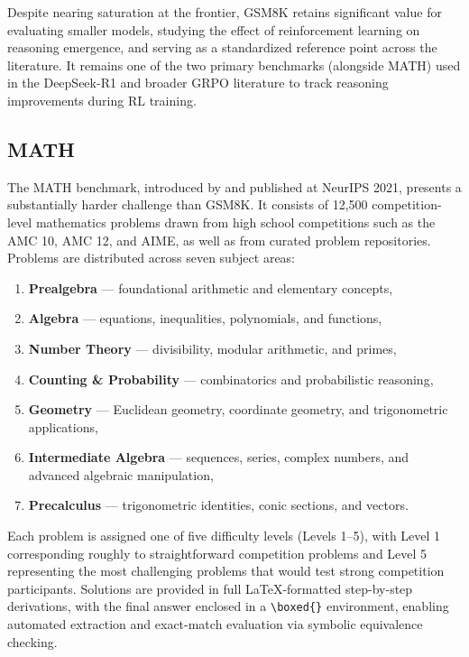 Despite nearing saturation at the frontier, GSM8K retains significant value for evaluating smaller models, studying the effect of reinforcement learning on reasoning emergence, and serving as a standardized reference point across the literature. It remains one of the two primary benchmarks (alongside MATH) used in the DeepSeek-R1 \cite{deepseek2025r1} and broader GRPO literature to track reasoning improvements during RL training.

\subsection{MATH}

The MATH benchmark, introduced by \cite{hendrycks2021math} and published at NeurIPS 2021, presents a substantially harder challenge than GSM8K. It consists of 12,500 competition-level mathematics problems drawn from high school competitions such as the AMC 10, AMC 12, and AIME, as well as from curated problem repositories. Problems are distributed across seven subject areas:

\begin{enumerate}
    \item \textbf{Prealgebra} --- foundational arithmetic and elementary concepts,
    \item \textbf{Algebra} --- equations, inequalities, polynomials, and functions,
    \item \textbf{Number Theory} --- divisibility, modular arithmetic, and primes,
    \item \textbf{Counting \& Probability} --- combinatorics and probabilistic reasoning,
    \item \textbf{Geometry} --- Euclidean geometry, coordinate geometry, and trigonometric applications,
    \item \textbf{Intermediate Algebra} --- sequences, series, complex numbers, and advanced algebraic manipulation,
    \item \textbf{Precalculus} --- trigonometric identities, conic sections, and vectors.
\end{enumerate}

Each problem is assigned one of five difficulty levels (Levels 1--5), with Level 1 corresponding roughly to straightforward competition problems and Level 5 representing the most challenging problems that would test strong competition participants. Solutions are provided in full \LaTeX-formatted step-by-step derivations, with the final answer enclosed in a \verb|\boxed{}| environment, enabling automated extraction and exact-match evaluation via symbolic equivalence checking.

